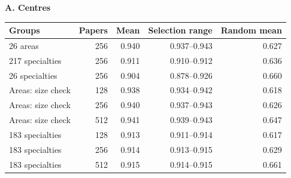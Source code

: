 \par\noindent\begin{minipage}{\linewidth}
\small
\setlength{\tabcolsep}{3pt}
\renewcommand{\arraystretch}{1.15}
\label{tab:S18}
\textbf{A. Centres}\par\smallskip
\begin{tabular*}{\linewidth}{@{\extracolsep{\fill}}lrrrr@{}}
\toprule
\textbf{Groups} & \textbf{Papers} & \textbf{Mean} & \textbf{Selection range} & \textbf{Random mean} \\
\midrule
26 areas & 256 & 0.940 & 0.937--0.943 & 0.627 \\[2pt]
217 specialties & 256 & 0.911 & 0.910--0.912 & 0.636 \\[2pt]
26 specialties & 256 & 0.904 & 0.878--0.926 & 0.660 \\[2pt]
Areas: size check & 128 & 0.938 & 0.934--0.942 & 0.618 \\[2pt]
Areas: size check & 256 & 0.940 & 0.937--0.943 & 0.626 \\[2pt]
Areas: size check & 512 & 0.941 & 0.939--0.943 & 0.647 \\[2pt]
183 specialties & 128 & 0.913 & 0.911--0.914 & 0.617 \\[2pt]
183 specialties & 256 & 0.914 & 0.913--0.915 & 0.629 \\[2pt]
183 specialties & 512 & 0.915 & 0.914--0.915 & 0.661 \\[2pt]
\bottomrule
\end{tabular*}


\end{minipage}
